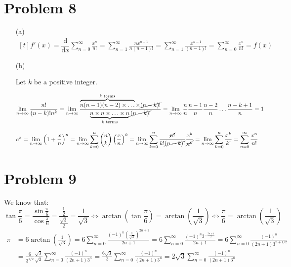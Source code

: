 \documentclass[preview, margin=0.6in]{standalone}
\newcommand*{\problem}[1]{\section*{Problem #1}}
\newcommand*{\deriv}[1][x]{\ensuremath{\dfrac{\mathrm{d}}{\mathrm{d}#1}}}
\begin{document}
\problem{8}
\begin{itemize}
	\item[(a)]
		$\begin{aligned}[t]
		    f'(x)
			=\deriv \sum_{n=0}^{\infty}\frac{x^n}{n!}
			=\sum_{n=1}^{\infty}\frac{nx^{n-1}}{n(n-1)!}
			=\sum_{n=1}^{\infty}\frac{x^{n-1}}{(n-1)!}
			=\sum_{n=0}^{\infty}\frac{x^{n}}{n!}
			=f(x)
		\end{aligned}$

	\item[(b)]
		\phantom{}
		\begin{mdframed}
			Let $k$ be a positive integer.

			$\begin{aligned}[t]
			    \lim_{n\to\infty}\frac{n!}{(n-k)!n^k}
				=\lim_{n\to\infty}\frac{\overbrace{n(n-1)(n-2)\times\ldots}^{\text{$k$ terms}} \times \cancel{(n-k)!}}{\underbrace{n\times n\times\ldots\times n}_{\text{$k$ terms}} \cancel{(n-k)!}}
				=\lim_{n\to\infty}\frac{n}{n}\frac{n-1}{n}\frac{n-2}{n}\ldots \frac{n-k+1}{n}
				=1
			\end{aligned}$
		\end{mdframed}
		$\begin{aligned}[t]
		    e^x
			&=\lim_{n\to\infty}\left(1+\frac{x}{n}\right)^n
			=\lim_{n\to\infty}\sum_{k=0}^{n}\binom nk \left(\frac{x}{n}\right)^k
			=\lim_{n\to\infty}\sum_{k=0}^{n}\frac{\cancel{n!}}{k!\cancel{(n-k)!}} \frac{x^k}{\cancel{n^k}}
			=\lim_{n\to\infty}\sum_{k=0}^{n}\frac{x^k}{k!}
			=\sum_{n=0}^{\infty}\frac{x^n}{n!}
		\end{aligned}$

\end{itemize}

\problem{9}

We know that:
\begin{equation*}
    \tan \frac{\pi}{6}
	=\frac{\sin \frac{\pi}{6}}{\cos \frac{\pi}{6}}
	=\frac{\frac{1}{2}}{\frac{\sqrt{3}}{2}}
	=\frac{1}{\sqrt{3}}
	\iff
	\arctan\left(\tan \frac{\pi}{6}\right)
	=\arctan\left(\frac{1}{\sqrt{3}}\right)
	\iff
	\frac{\pi}{6}
	=\arctan\left(\frac{1}{\sqrt{3}}\right)
\end{equation*}
\begin{align*}
	\pi
	&=6 \arctan\left(\frac{1}{\sqrt{3}}\right)
	=6 \sum_{n=0}^{\infty}\frac{(-1)^n \left(\frac{1}{\sqrt{3}}\right)^{2n+1}}{2n+1}
	=6 \sum_{n=0}^{\infty}\frac{(-1)^n 3^{-\frac{2n+1}2}}{2n+1}
	=6 \sum_{n=0}^{\infty}\frac{(-1)^n}{(2n+1) 3^{n+1/2}} \\
	&=\frac{6}{3^{1/2}}\frac{\sqrt{3}}{\sqrt{3}} \sum_{n=0}^{\infty}\frac{(-1)^n}{(2n+1) 3^{n}}
	=\frac{6\sqrt 3}{3}\sum_{n=0}^{\infty}\frac{(-1)^n}{(2n+1) 3^{n}}
	=2 \sqrt{3}\sum_{n=0}^{\infty}\frac{(-1)^n}{(2n+1) 3^{n}}
\end{align*}
\end{document}
